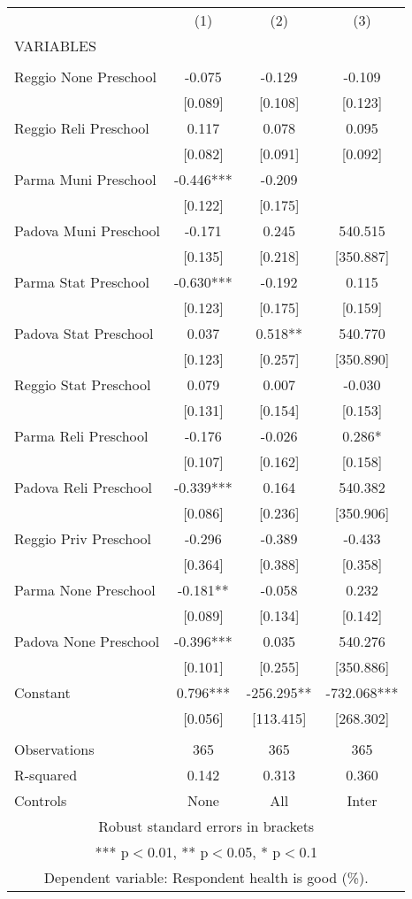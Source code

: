 \begin{tabular}{lccc} \hline
 & (1) & (2) & (3) \\
VARIABLES &  &  &  \\ \hline
 &  &  &  \\
Reggio None Preschool & -0.075 & -0.129 & -0.109 \\
 & [0.089] & [0.108] & [0.123] \\
Reggio Reli Preschool & 0.117 & 0.078 & 0.095 \\
 & [0.082] & [0.091] & [0.092] \\
Parma Muni Preschool & -0.446*** & -0.209 &  \\
 & [0.122] & [0.175] &  \\
Padova Muni Preschool & -0.171 & 0.245 & 540.515 \\
 & [0.135] & [0.218] & [350.887] \\
Parma Stat Preschool & -0.630*** & -0.192 & 0.115 \\
 & [0.123] & [0.175] & [0.159] \\
Padova Stat Preschool & 0.037 & 0.518** & 540.770 \\
 & [0.123] & [0.257] & [350.890] \\
Reggio Stat Preschool & 0.079 & 0.007 & -0.030 \\
 & [0.131] & [0.154] & [0.153] \\
Parma Reli Preschool & -0.176 & -0.026 & 0.286* \\
 & [0.107] & [0.162] & [0.158] \\
Padova Reli Preschool & -0.339*** & 0.164 & 540.382 \\
 & [0.086] & [0.236] & [350.906] \\
Reggio Priv Preschool & -0.296 & -0.389 & -0.433 \\
 & [0.364] & [0.388] & [0.358] \\
Parma None Preschool & -0.181** & -0.058 & 0.232 \\
 & [0.089] & [0.134] & [0.142] \\
Padova None Preschool & -0.396*** & 0.035 & 540.276 \\
 & [0.101] & [0.255] & [350.886] \\
Constant & 0.796*** & -256.295** & -732.068*** \\
 & [0.056] & [113.415] & [268.302] \\
 &  &  &  \\
Observations & 365 & 365 & 365 \\
R-squared & 0.142 & 0.313 & 0.360 \\
 Controls & None & All & Inter \\ \hline
\multicolumn{4}{c}{ Robust standard errors in brackets} \\
\multicolumn{4}{c}{ *** p$<$0.01, ** p$<$0.05, * p$<$0.1} \\
\multicolumn{4}{c}{ Dependent variable: Respondent health is good (\%).} \\
\end{tabular}
